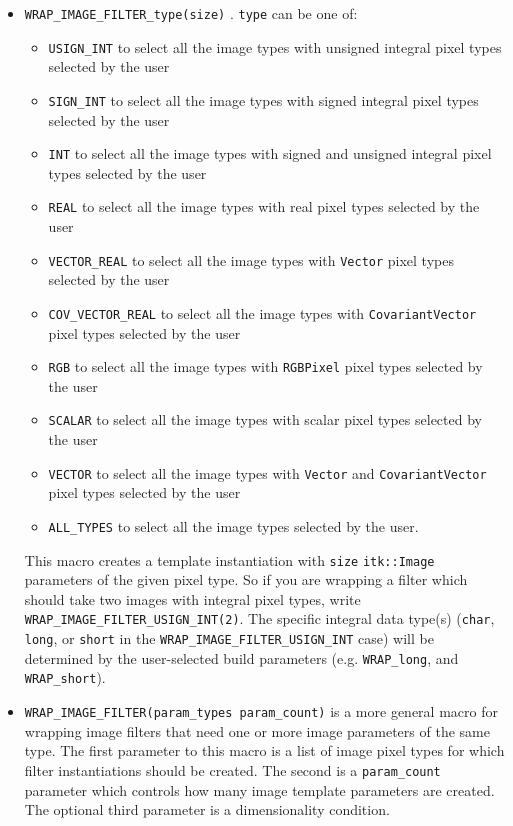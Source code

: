 \documentclass{InsightArticle}
\begin{document}
\begin{itemize}

  \item \verb$WRAP_IMAGE_FILTER_type(size)$ . \verb$type$ can be one of:
  \begin{itemize}
    \item \verb$USIGN_INT$ to select all the image types with unsigned integral
pixel types selected by the user
    \item \verb$SIGN_INT$ to select all the image types with signed integral
pixel types selected by the user
    \item \verb$INT$ to select all the image types with signed and unsigned integral
pixel types selected by the user
    \item \verb$REAL$ to select all the image types with real pixel types selected by the user
    \item \verb$VECTOR_REAL$ to select all the image types with \verb$Vector$
pixel types selected by the user
    \item \verb$COV_VECTOR_REAL$ to select all the image types with \verb$CovariantVector$
pixel types selected by the user
    \item \verb$RGB$ to select all the image types with \verb$RGBPixel$
pixel types selected by the user
    \item \verb$SCALAR$ to select all the image types with scalar pixel types selected by the user
    \item \verb$VECTOR$ to select all the image types with \verb$Vector$ and \verb$CovariantVector$
pixel types selected by the user
    \item \verb$ALL_TYPES$ to select all the image types selected by the user.
  \end{itemize}

 This macro creates a template instantiation with \verb$size$
\verb$itk::Image$ parameters of the given pixel type. So if you are wrapping a filter
which should take two images with integral pixel types, write \verb$WRAP_IMAGE_FILTER_USIGN_INT(2)$. The
specific integral data type(s) (\verb$char$, \verb$long$, or \verb$short$ in the \verb$WRAP_IMAGE_FILTER_USIGN_INT$ case) will
be determined by the user-selected build parameters (e.g. \verb$WRAP_long$, and
\verb$WRAP_short$).

  \item \verb$WRAP_IMAGE_FILTER(param_types param_count)$ is a more general
macro for wrapping image filters that need one or more image parameters of the
same type. The first parameter to this macro is a list of image pixel types for
which filter instantiations should be created. The second is a \verb$param_count$
parameter which controls how many image template parameters are created. The
optional third parameter is a dimensionality condition.


\end{itemize}
\end{document}
